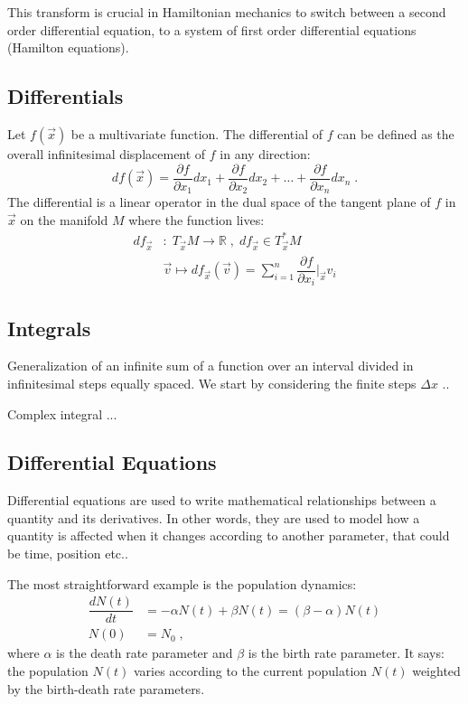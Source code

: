 \documentclass[12pt,a4paper]{article}
\begin{document}
This transform is crucial in Hamiltonian mechanics to switch between a
second order differential equation, to a system of first order differential equations (Hamilton equations).

\subsection{Differentials}
Let $f(\vec{x})$ be a multivariate function. The differential of $f$ can be defined
as the overall infinitesimal displacement of $f$ in any direction:
\begin{equation}
	df(\vec{x}) = \dfrac{\partial f}{\partial x_1}dx_1 + \dfrac{\partial f}{\partial x_2}dx_2 + \dots + \dfrac{\partial f}{\partial x_n}dx_n \; .
\end{equation}
The differential is a linear operator in the dual space of the tangent plane of $f$ in $\vec{x}$ on the manifold $M$ where the function lives:
\begin{align*}
	df_{\vec{x}} & :\; T_{\vec{x}} M \rightarrow \mathbb{R}\;, \; df_{\vec{x}}\in T^*_{\vec{x}} M \\[2pt]
	&\vec{v} \mapsto df_{\vec{x}}(\vec{v}) = \sum_{i=1}^{n}\dfrac{\partial f}{\partial x_i}\bigg|_{\vec{x}} v_i
\end{align*}

\subsection{Integrals}
Generalization of an infinite sum of a function over an interval divided in
infinitesimal steps equally spaced. We start by considering the finite steps $\Delta x$
..

Complex integral
...

\subsection{Differential Equations}
Differential equations are used to write mathematical relationships between a quantity and its derivatives. In other words, they are used to model how a quantity is affected when it changes according to another parameter, that could be time, position etc..

The most straightforward example is the population dynamics:
\begin{align*}
	\dfrac{d N(t)}{d t} &= -\alpha N(t) + \beta N(t) = (\beta - \alpha) N(t) \\[8pt]
	N(0) &= N_0 \;,
\end{align*}
where $\alpha$ is the death rate parameter and $\beta$ is the birth rate parameter. It says: the population $N(t)$ varies according to the current population $N(t)$ weighted by the birth-death rate parameters.
\end{document}
